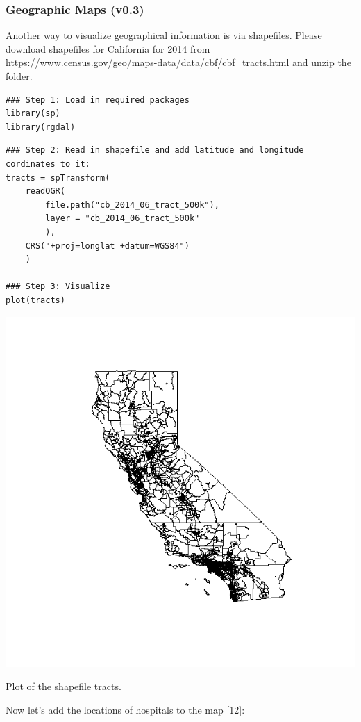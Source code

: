 \begin{frame}
\frametitle{Geographic Maps (v0.3)}

Another way to visualize geographical information is via shapefiles. Please download shapefiles for California for 2014 from \url{https://www.census.gov/geo/maps-data/data/cbf/cbf_tracts.html} and unzip the folder.

\begin{lstlisting}
### Step 1: Load in required packages
library(sp)
library(rgdal)
\end{lstlisting}

\newpage
\begin{lstlisting}
### Step 2: Read in shapefile and add latitude and longitude cordinates to it:
tracts = spTransform(
	readOGR(
		file.path("cb_2014_06_tract_500k"), 
		layer = "cb_2014_06_tract_500k"
		), 
	CRS("+proj=longlat +datum=WGS84")
	) 

### Step 3: Visualize
plot(tracts)
\end{lstlisting}

\newpage
       \begin{center}
		\includegraphics[scale=0.25]{images/shapefile_v0.png}
		\caption{Plot of the shapefile tracts.}
	\end{center}

\newpage
Now let's add the locations of hospitals to the map [12]:


\end{frame}
